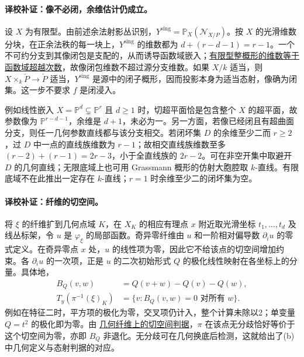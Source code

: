 \endgroup


\hypertarget{D18-105-notes}{}

\begingroup
\def\PP{\mathbb P}\def\OO{\mathcal O}\def\Ocal{\mathcal O}
\def\F{\mathcal F}\def\G{\mathcal G}\def\N{\mathcal N}
\def\PD{\check P}\def\Pdual{\check P}
\def\Ys{Y^{\mathrm{sing}}}\def\Ysing{Y^{\mathrm{sing}}}
\def\Ds{Y^{\mathrm{sup\,sing}}}\def\Ysup{Y^{\mathrm{sup\,sing}}}
\def\cod{\operatorname{codim}}\def\Sing{\operatorname{Sing}}
\def\depth{\operatorname{depth}}\def\coprof{\operatorname{coprof}}
\def\Ass{\operatorname{Ass}}\def\Supp{\operatorname{Supp}}
\def\Gr{\operatorname{Gr}}\def\Spec{\operatorname{Spec}}\def\Proj{\operatorname{Proj}}


\paragraph{译校补证：像不必闭，余维估计仍成立。}
设 $X$ 为有限型。由前述余法射影丛识别，$\Ysing=\PP_X(\mathcal N_{X/P})$。按 $X$ 的光滑维数分块，在正余法秩的每一块上，$\Ysing$ 的维数都为 $d+(r-d-1)=r-1$。一个不可约分支到其像闭包是支配的，从而诱导函数域嵌入；\href{https://stacks.math.columbia.edu/tag/0A21}{有限型整概形的维数等于函数域超越次数}，故像闭包维数不超过源分支维数。如果 $X/k$ 适当，则 $X\times_k\Pdual\to\Pdual$ 适当，$\Ysing$ 是源中的闭子概形，因而投影本身为适当态射，像确为闭集。这一步不要求 $f$ 是闭浸入。

例如线性嵌入 $X=\PP^d\subsetneq \PP^r$ 且 $d\ge1$ 时，切超平面恰是包含整个 $X$ 的超平面，故参数像为 $\PP^{r-d-1}$，余维是 $d+1$，未必为一。另一方面，若像已经闭且有超曲面分支，则任一几何参数直线都与该分支相交。若闭坏集 $D$ 的余维至少二而 $r\ge2$，过 $D$ 中一点的直线族维数为 $r-1$；故相交直线族维数至多 $(r-2)+(r-1)=2r-3$，小于全直线族的 $2r-2$。可在非空开集中取避开 $D$ 的几何直线；无限底域上也可用 Grassmann 概形的仿射大胞腔取 $k$-直线。有限底域不在此推出一定存在 $k$-直线；$r=1$ 时余维至少二的闭坏集为空。

\paragraph{译校补证：纤维的切空间。}
将 $\xi$ 的纤维扩到几何点域 $K$，在 $X_K$ 的相应有理点 $x$ 附近取光滑坐标 $t_1,\ldots,t_d$ 及线丛标架，令 $u$ 是 $\varphi_\xi$ 的局部函数。奇异零纤维由 $u$ 和一阶相对偏导数 $\partial_i u$ 的零式定义。在奇异零点 $x$ 处，$u$ 的线性项为零，因此它不给该点的切空间增加约束。各 $\partial_i u$ 的一次项，正是 $u$ 的二次初始形式 $Q$ 的极化线性映射在各坐标上的分量。具体地，
\[
\begin{aligned}
 B_Q(v,w)&=Q(v+w)-Q(v)-Q(w),\\
 T_{y}(\pi^{-1}(\xi)_K)&=\{v:B_Q(v,w)=0\text{ 对所有 }w\}.
\end{aligned}
\]
例如在特征二时，平方项的极化为零，交叉项仍计入，整个计算未除以2；单变量 $Q=t^2$ 的极化即为零。由 \href{https://stacks.math.columbia.edu/tag/0B2G}{几何纤维上的切空间判据}，$\pi$ 在该点无分歧恰好等价于这个切空间为零，亦即 $B_Q$ 非退化。无分歧可在几何换底后检测，这就给出了(b)中几何定义与态射判据的对应。


